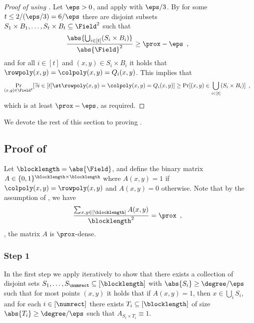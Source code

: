\documentclass{toc}
\theoremstyle{plain}
\begin{document}
\begin{proof}[Proof of  using ]
    Let $\eps  > 0$, and apply 
    with $\eps/3$.
    By  for some
    $t \leq {2}/{(\eps/3)} = {6}/{\eps}$
    there are disjoint subsets $S_1 \times B_1,\dots,S_t \times B_t \subseteq \Field^2$
    such that
%
%
    \[{\frac{\abs{\bigcup_{i \in [t]} (S_i \times B_i)}}{\abs{\Field}^2} \geq \prox - \eps}\enspace,
    \]
    and %
    for all $i \in [t]$ and $(x,y) \in S_i \times B_i$ it holds that
    $\rowpoly(x,y) = \colpoly(x,y) = Q_i(x,y)$.  This implies that
    \begin{equation*}
        \Pr_{(x,y) \in \Field^2}[\exists i \in [t] \st \rowpoly(x,y) = \colpoly(x,y)= Q_i(x,y)] \geq
%
  \Pr[(x,y) \in \bigcup_{i \in [t]} (S_i \times B_i)] \enspace,  %
    \end{equation*}
    which is at least $\prox - \eps$, as required.
\end{proof}

We devote the rest of this section to proving .

\subsection{Proof of }

    Let $\blocklength = \abs{\Field}$, and define the binary matrix $A \in \{0,1\}^{\blocklength \times \blocklength}$
    where $A(x,y) = 1$ if $\colpoly(x,y) = \rowpoly(x,y)$ and $A(x,y) = 0$ otherwise.
    Note that by the assumption of , we have
    \[
      \frac{\sum_{x,y \in [\blocklength]} A(x,y)}{\blocklength^2} = \prox\enspace,
      \]
      \ie, the matrix $A$ is $\prox$-dense.
\subsubsection{Step 1}


    In the first step we apply  iteratively to show that there exists a collection of disjoint sets $S_1,\dots,S_{\numrect} \subseteq [\blocklength]$
    with $\abs{S_i} \geq {\degree}/{\eps}$ such that for most points $(x,y)$ it holds that if $A(x,y) = 1$,
%
%
%
    then $x \in \bigcup_i S_i$,             %
    and for each $i \in [\numrect]$ there exists $T_i \subseteq [\blocklength]$ of size $\abs{T_i} \geq {\degree}/{\eps}$ such that $A_{S_i \times T_i} \equiv 1$.
\end{document}
